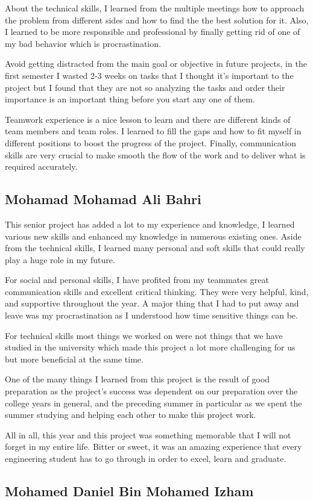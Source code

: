 \documentclass[../main.tex]{subfiles}
\begin{document}
About the technical skills, I learned from the multiple meetings how to 
approach the problem from different sides and how to find the 
the best solution for it. Also, I learned to be more responsible
and professional by finally getting rid of one of my bad behavior 
which is procrastination.

Avoid getting distracted from the main goal or objective in 
future projects, in the first semester I wasted 2-3 weeks 
on tasks that I thought it's important to the project but 
I found that they are not so analyzing the tasks and 
order their importance is an important thing before
you start any one of them.

Teamwork experience is a nice lesson to learn and 
there are different kinds of team members and team roles.
I learned to fill the gaps and how to fit myself in different 
positions to boost the progress of the project. 
Finally, communication skills are very crucial to make smooth 
the flow of the work and to deliver what is required accurately.

\subsection{Mohamad Mohamad Ali Bahri}
This senior project has added a lot to my experience and knowledge, I learned
various new skills and enhanced my knowledge in numerous existing ones. 
Aside from the technical skills, I learned many personal and soft skills that 
could really play a huge role in my future. 

For social and personal skills, I have profited from my teammates great 
communication skills and excellent critical thinking. They were very helpful, 
kind, and supportive throughout the year. A major thing that I had to put away
and leave was my procrastination as I understood how time sensitive things can
be. 

For technical skills most things we worked on were not things that we have 
studied in the university which made this project a lot more challenging for 
us but more beneficial at the same time. 

One of the many things I learned from this project is the result of good 
preparation as the project's success was dependent on our preparation over the 
college years in general, and the preceding summer in particular as we spent 
the summer studying and helping each other to make this project work.

All in all, this year and this project was something memorable that I will not 
forget in my entire life. Bitter or sweet, it was an amazing experience that 
every engineering student has to go through in order to excel, learn and 
graduate.

\subsection{Mohamed Daniel Bin Mohamed Izham}

\lipsum[3]
\end{document}
